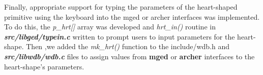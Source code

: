 Finally,   appropriate   support   for   typing   the   parameters   of   the   heart­-shaped  
primitive   using   the   keyboard   into   the   mged   or   archer   interfaces   was  
implemented.   To   do   this, the   \textit{p\_hrt[]}   array was developed  and   \textit{hrt\_in()}   routine   in  
\textit{\textbf{src/libged/typein.c}} written  to   prompt   users   to   input   parameters   for   the   heart­-shape.  
Then ,we   added   the   \textit{mk\_hrt()}   function   to   the   include/wdb.h   and  \textit{\textbf{src/libwdb/wdb.c}} files   to   assign   values   from   \textbf{mged}   or   \textbf{archer}   interfaces   to   the  heart-shape's parameters.
 
